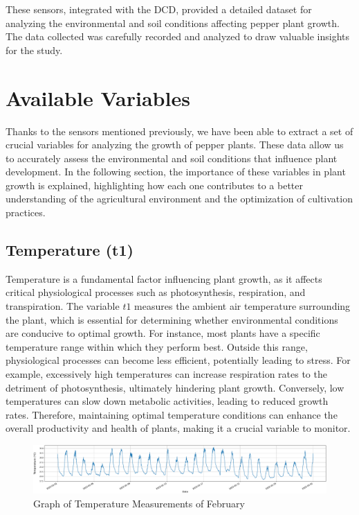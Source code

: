 These sensors, integrated with the DCD, provided a detailed dataset for analyzing the environmental and soil conditions affecting pepper plant growth. The data collected was carefully recorded and analyzed to draw valuable insights for the study.


\section{Available Variables}

Thanks to the sensors mentioned previously, we have been able to extract a set of crucial variables for analyzing the growth of pepper plants. These data allow us to accurately assess the environmental and soil conditions that influence plant development. In the following section, the importance of these variables in plant growth is explained, highlighting how each one contributes to a better understanding of the agricultural environment and the optimization of cultivation practices.

\subsection{Temperature (t1)}

Temperature is a fundamental factor influencing plant growth, as it affects critical physiological processes such as photosynthesis, respiration, and transpiration. The variable \( t1 \) measures the ambient air temperature surrounding the plant, which is essential for determining whether environmental conditions are conducive to optimal growth. For instance, most plants have a specific temperature range within which they perform best. Outside this range, physiological processes can become less efficient, potentially leading to stress. For example, excessively high temperatures can increase respiration rates to the detriment of photosynthesis, ultimately hindering plant growth. Conversely, low temperatures can slow down metabolic activities, leading to reduced growth rates. Therefore, maintaining optimal temperature conditions can enhance the overall productivity and health of plants, making it a crucial variable to monitor.

\begin{figure}[htbp]
    \centering
    \includegraphics[width=15 cm]{4_ChapterMaterials/figuras/train_data_Temperature.pdf}
    \caption{Graph of Temperature Measurements of February}
    \end{figure}

